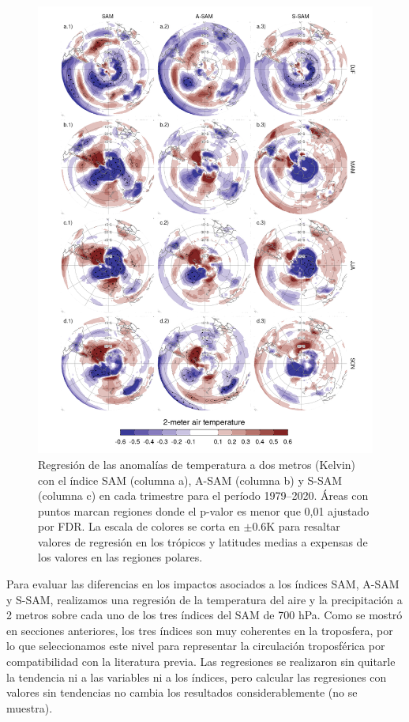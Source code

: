 \documentclass[12pt,oneside,a4paper]{reedthesis}
\begin{document}
\begin{figure}

{\centering \includegraphics{figures/30-sam/regr-air-season-1} 

}

\caption{Regresión de las anomalías de temperatura a dos metros (Kelvin) con el índice SAM (columna a), A-SAM (columna b) y S-SAM (columna c) en cada trimestre para el período 1979--2020. Áreas con puntos marcan regiones donde el p-valor es menor que 0,01 ajustado por FDR. La escala de colores se corta en \(\pm0.6 \mathrm{K}\) para resaltar valores de regresión en los trópicos y latitudes medias a expensas de los valores en las regiones polares.}\label{fig:regr-air-season}
\end{figure}

Para evaluar las diferencias en los impactos asociados a los índices SAM, A-SAM y S-SAM, realizamos una regresión de la temperatura del aire y la precipitación a 2 metros sobre cada uno de los tres índices del SAM de 700 hPa.
Como se mostró en secciones anteriores, los tres índices son muy coherentes en la troposfera, por lo que seleccionamos este nivel para representar la circulación troposférica por compatibilidad con la literatura previa.
Las regresiones se realizaron sin quitarle la tendencia ni a las variables ni a los índices, pero calcular las regresiones con valores sin tendencias no cambia los resultados considerablemente (no se muestra).
\end{document}

